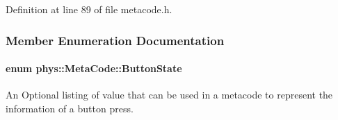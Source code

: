 Definition at line 89 of file metacode.h.



\subsubsection{Member Enumeration Documentation}
\hypertarget{classphys_1_1MetaCode_a2fdfb26b3e50ceb0ccc60bfc4c3d6ac2}{
\paragraph[{ButtonState}]{\setlength{\rightskip}{0pt plus 5cm}enum {\bf phys::MetaCode::ButtonState}}\hfill}
\label{classphys_1_1MetaCode_a2fdfb26b3e50ceb0ccc60bfc4c3d6ac2}


An Optional listing of value that can be used in a metacode to represent the information of a button press. 


